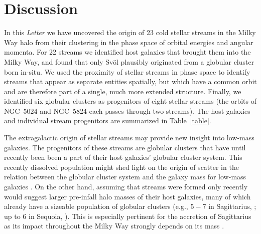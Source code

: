 \documentclass[twocolumn]{aastex63}
\begin{document}
\section{Discussion}
\label{sec:discussion}

In this {\it Letter} we have uncovered the origin of 23 cold stellar streams in the Milky Way halo from their clustering in the phase space of orbital energies and angular momenta.
For 22 streams we identified host galaxies that brought them into the Milky Way, and found that only Sv\" ol plausibly originated from a globular cluster born in-situ.
We used the proximity of stellar streams in phase space to identify streams that appear as separate entities spatially, but which have a common orbit and are therefore part of a single, much more extended structure.
Finally, we identified six globular clusters as progenitors of eight stellar streams (the orbits of NGC~5024 and NGC~5824 each passes through two streams).
The host galaxies and individual stream progenitors are summarized in Table~\ref{table}.

The extragalactic origin of stellar streams may provide new insight into low-mass galaxies.
The progenitors of these streams are globular clusters that have until recently been been a part of their host galaxies' globular cluster system.
This recently dissolved population might shed light on the origin of scatter in the relation between the globular cluster system and the galaxy mass for low-mass galaxies \citep[e.g.,][]{harris2013}.
On the other hand, assuming that streams were formed only recently would suggest larger pre-infall halo masses of their host galaxies, many of which already have a sizeable population of globular clusters (e.g., $5-7$ in Sagittarius, \citealt{Johnson2020}; up to 6 in Sequoia, \citealt{myeong2019}).
This is especially pertinent for the accretion of Sagittarius as its impact throughout the Milky Way strongly depends on its mass \citep{laporte2019}.
\end{document}
